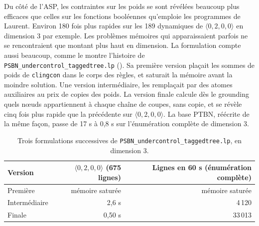 \documentclass[12pt, a4paper]{article}
\begin{document}
Du côté de l'ASP, les contraintes sur les poids se sont révélées beaucoup plus efficaces que celles sur les fonctions booléennes qu'emploie les programmes de Laurent. Environ 180 fois plus rapides sur les 189 dynamiques de $\langle 0,2,0,0\rangle$ en dimension 3 par exemple. Les problèmes mémoires qui apparaissaient parfois ne se rencontraient que montant plus haut en dimension.
La formulation compte aussi beaucoup, comme le montre l'histoire de \texttt{PSBN\_undercontrol\_taggedtree.lp} ().
Sa première version plaçait les sommes de poids de \texttt{clingcon} dans le corps des règles, et saturait la mémoire avant la moindre solution.
Une version intermédiaire, les remplaçait par des atomes auxiliaires au prix de copies des poids.
La version finale calcule dès le grounding quels nœuds appartiennent à chaque chaîne de coupes, sans copie, et se révèle cinq fois plus rapide que la précédente sur $\langle 0,2,0,0\rangle$.
La base PTBN, réécrite de la même façon, passe de 17 s à 0,8 s sur l'énumération complète de dimension 3.

\begin{table}[H]
\centering
\small
\caption{Trois formulations successives de \texttt{PSBN\_undercontrol\_taggedtree.lp}, en dimension 3.}
\label{tab:formulations}
\begin{tabular}{lrr}
\toprule
Version & $\langle 0,2,0,0\rangle$ (675 lignes) & Lignes en 60 s (énumération complète) \\
\midrule
Première & mémoire saturée & mémoire saturée \\
Intermédiaire & 2,6 s & 4\,120 \\
Finale & 0,50 s & 33\,013 \\
\bottomrule
\end{tabular}
\end{table}
\end{document}

